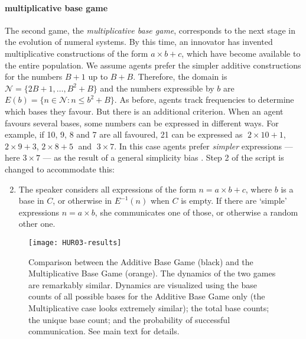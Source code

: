 \documentclass{../src/bcthesispart}
\begin{document}
\paragraph{multiplicative base game}

The second game, the \emph{multiplicative base game}, corresponds to the next stage in the evolution of numeral systems.
By this time, an innovator has invented multiplicative constructions of the form $a\times b +c$, which have become available to the entire population.
We assume agents prefer the simpler additive constructions for the numbers $B+1$ up to $B+B$.
Therefore, the domain is $\mathcal{N} = \{2B+1, \dots, B^2 + B\}$ and the numbers expressible by $b$ are $E(b) = \{n \in \mathcal{N}: n \le b^2 + B \}$.
As before, agents track frequencies to determine which bases they favour. 
But there is an additional criterion. 
When an agent favours several bases, some numbers can be expressed in different ways.
For example, if 10, 9, 8 and 7 are all favoured, 21 can be expressed as
$\;2\times 10 + 1$, \; $2\times 9 + 3$,\; $2\times 8 + 5\;$ and $\;3 \times 7$.
In this case agents prefer \emph{simpler} expressions --- here $3 \times 7$ --- as the result of a general simplicity bias \parencite{Hurford1987}.
Step 2 of the script is changed to accommodate this:
\begin{enumerate}\setcounter{enumi}{1}
	\item The speaker considers all expressions of the form $n=a\times b + c$, where $b$ is a base in $C$, or otherwise in $E^{-1}(n)$ when $C$ is empty. If there are ‘simple’ expressions $n=a\times b$, she communicates one of those, or otherwise a random other one.
\end{enumerate}




\begin{SCfigure}
	\texttt{[image: HUR03-results]}	
	\caption{Comparison between the Additive Base Game (black) and the Multiplicative Base Game (orange). 
		The dynamics of the two games are remarkably similar.
		Dynamics are visualized using
		 the base counts of all possible bases for the Additive Base Game only (the Multiplicative case looks extremely similar);
		 the total base counts;
		 the unique base count; and
		 the probability of successful communication.
		See main text for details.
		\label{fig:HUR03-results}}
\end{SCfigure}
\end{document}
